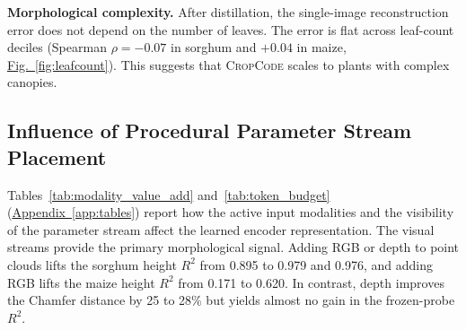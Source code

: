 \documentclass[10pt,twocolumn,letterpaper]{article}
\newcommand{\figref}[1]{\hyperref[#1]{Fig.~\ref*{#1}}}
\newcommand{\appendixref}[1]{\hyperref[#1]{Appendix~\ref*{#1}}}
\newcommand{\method}{\textup{\textsc{CropCode}}}   %
\begin{document}
\noindent\textbf{Morphological complexity.}
After distillation, the single-image reconstruction error does not depend on the number of leaves. The error is flat across leaf-count deciles (Spearman $\rho = -0.07$ in sorghum and $+0.04$ in maize, \figref{fig:leafcount}). This suggests that \method{} scales to plants with complex canopies.



\subsection{Influence of Procedural Parameter Stream Placement}
\label{sec:param-stream}\label{sec:exp-params}

\textcolor{cvprblue}{Tables}~\ref{tab:modality_value_add} and~\ref{tab:token_budget} (\appendixref{app:tables}) report how the active input modalities and the visibility of the parameter stream affect the learned encoder representation. The visual streams provide the primary morphological signal. Adding RGB or depth to point clouds lifts the sorghum height $R^2$ from 0.895 to 0.979 and 0.976, and adding RGB lifts the maize height $R^2$ from 0.171 to 0.620. In contrast, depth improves the Chamfer distance by 25 to 28\% but yields almost no gain in the frozen-probe $R^2$.
\end{document}

